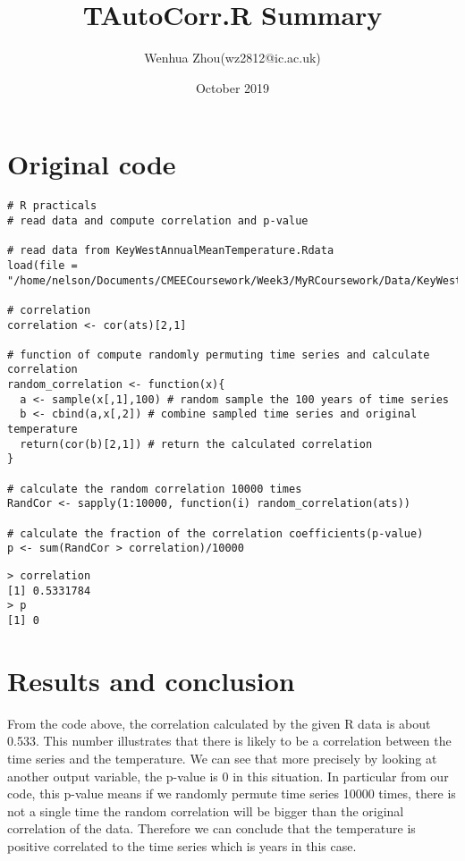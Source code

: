 \documentclass{article}
\title{TAutoCorr.R Summary}
\author{Wenhua Zhou(wz2812@ic.ac.uk)}
\date{October 2019}
\begin{document}
\maketitle

\section{Original code}
\begin{lstlisting}[caption=Source code for TAutoCorr.R(including comments)]
# R practicals
# read data and compute correlation and p-value

# read data from KeyWestAnnualMeanTemperature.Rdata
load(file = "/home/nelson/Documents/CMEECoursework/Week3/MyRCoursework/Data/KeyWestAnnualMeanTemperature.RData")

# correlation
correlation <- cor(ats)[2,1]

# function of compute randomly permuting time series and calculate correlation
random_correlation <- function(x){
  a <- sample(x[,1],100) # random sample the 100 years of time series
  b <- cbind(a,x[,2]) # combine sampled time series and original temperature
  return(cor(b)[2,1]) # return the calculated correlation
}

# calculate the random correlation 10000 times
RandCor <- sapply(1:10000, function(i) random_correlation(ats)) 

# calculate the fraction of the correlation coefficients(p-value)
p <- sum(RandCor > correlation)/10000
\end{lstlisting}

\begin{lstlisting}
> correlation
[1] 0.5331784
> p
[1] 0
\end{lstlisting}

\section{Results and conclusion}
From the code above, the correlation calculated by the given R data is about 0.533. This number illustrates that there is likely to be a correlation between the time series and the temperature. We can see that more precisely by looking at another output variable, the p-value is 0 in this situation. In particular from our code, this p-value means if we randomly permute time series 10000 times, there is not a single time the random correlation will be bigger than the original correlation of the data. Therefore we can conclude that the temperature is positive correlated to the time series which is years in this case.
\end{document}
